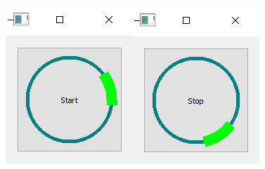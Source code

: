 \begin{multicols}{2}
    
    
\begin{minipage}{0.8\linewidth}
    \includegraphics[width=0.5\linewidth]{images/circlebutton1}\includegraphics[width=0.5\linewidth]{images/circlebutton2}
    \newline
    \newline
\end{minipage}
\end{multicols}


\clearpage





